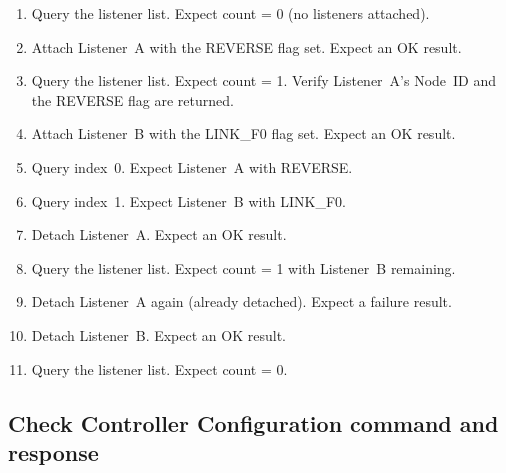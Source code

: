 \begin{enumerate}

    \item Query the listener list. Expect count = 0 (no listeners attached).

    \item Attach Listener~A with the REVERSE flag set. Expect an OK result.

    \item Query the listener list. Expect count = 1. Verify Listener~A's
          Node~ID and the REVERSE flag are returned.

    \item Attach Listener~B with the LINK\_F0 flag set. Expect an OK result.

    \item Query index~0. Expect Listener~A with REVERSE.

    \item Query index~1. Expect Listener~B with LINK\_F0.

    \item Detach Listener~A. Expect an OK result.

    \item Query the listener list. Expect count = 1 with Listener~B remaining.

    \item Detach Listener~A again (already detached). Expect a failure result.

    \item Detach Listener~B. Expect an OK result.

    \item Query the listener list. Expect count = 0.

\end{enumerate}


\subsection{Check Controller Configuration command and response}

